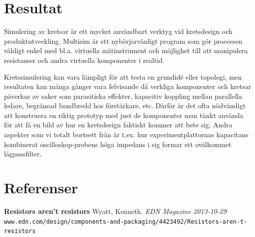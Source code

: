 \documentclass[11pt,a4paper]{article}
\begin{document}
\section{Resultat}\label{setup}
Simulering av kretsar är ett mycket användbart verktyg vid kretsdesign och
produktutveckling. Multisim är ett nybörjarvänligt program som gör processen
väldigt enkel med bl.a. virtuella mätinstrument och möjlighet till att
manipulera resistanser och andra virtuella komponenter i realtid.  \par
Kretssimulering kan vara lämpligt för att testa en grundidé eller topologi, men
resultaten kan många gånger vara felvisande då verkliga komponenter och kretsar
påverkas av saker som parasitiska effekter, kapacitiv koppling mellan
parallella ledare, begränsad bandbredd hos förstärkare, etc.  Därför är det
ofta nödvändigt att konstruera en riktig prototyp med just de komponenter man
tänkt använda för att få en bild av hur en kretsdesign faktiskt kommer att bete
sig.  Andra aspekter som vi totalt bortsett från är t.ex. hur
experimentplattornas kapacitans kombinerat oscilloskop-probens höga impedans i
sig formar ett ovälkommet lågpassfilter.


\newpage

\section{Referenser}\label{refs}

\textbf{Resistors aren't resistors} Wyatt, Kenneth. \textit{EDN Magazine 2013-10-29}
\texttt{www.edn.com/design/components-and-packaging/4423492/Resistors-aren-t-resistors}






\end{document}
